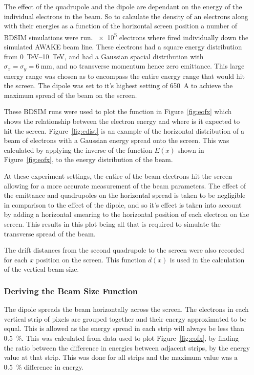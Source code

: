 The effect of the quadrupole and the dipole are dependant on the energy of the
individual electrons in the beam.  So to calculate the density of an electrons
along with their energies as a function of the horizontal screen position a
number of BDSIM simulations were run. \num{e5} electrons where fired
individually down the simulated AWAKE beam line. These electrons had a square
energy distribution from \SIrange{0}{10} {\tera\electronvolt}, and had a
Gaussian spacial distribution with \(\sigma_x = \sigma_y =
\SI{6}{\milli\meter}\), and no transverse momentum hence zero emittance. This
large energy range was chosen as to encompass the entire energy range that would
hit the screen. The dipole was set to it's highest setting of \SI{650}{\ampere}
to achieve the maximum spread of the beam on the screen.

These BDSIM runs were used to plot the function in Figure~\ref{fig:eofx} which
shows the relationship between the electron energy and where is it expected to
hit the screen. Figure~\ref{fig:edist} is an example of the horizontal
distribution of a beam of electrons with a Gaussian energy spread onto the
screen. This was calculated by applying the inverse of the function \(E(x)\)
shown in Figure~\ref{fig:eofx}, to the energy distribution of the beam.

At these experiment settings, the entire of the beam electrons hit the screen
allowing for a more accurate measurement of the beam parameters.  The effect of
the emittance and quadrupoles on the horizontal spread is taken to be negligible
in comparison to the effect of the dipole, and so it's effect is taken into
account by adding a horizontal smearing to the horizontal position of each
electron on the screen. This results in this plot being all that is required to
simulate the transverse spread of the beam.

The drift distances from the second quadrupole to the screen were also recorded
for each \(x\) position on the screen. This function \(d(x)\) is used in the
calculation of the vertical beam size.


\subsubsection{Deriving the Beam Size Function}

The dipole spreads the beam horizontally across the screen. The electrons in
each vertical strip of pixels are grouped together and their energy approximated
to be equal. This is allowed as the energy spread in each strip will always be
less than \SI{0.5}{\percent}. This was calculated from data used to plot
Figure~\ref{fig:eofx}, by finding the ratio between the difference in energies
between adjacent strips, by the energy value at that strip. This was done for
all strips and the maximum value was a \SI{0.5}{\percent} difference in energy.


